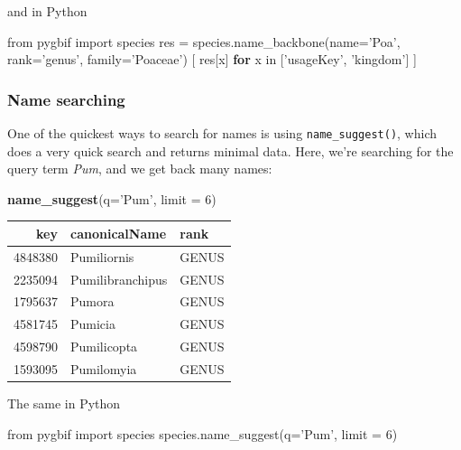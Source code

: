 \documentclass[author-year, review, 11pt]{components/elsarticle} %
\newenvironment{Shaded}{\begin{snugshade}}{\end{snugshade}}
\newcommand{\KeywordTok}[1]{\textcolor[rgb]{0.13,0.29,0.53}{\textbf{{#1}}}}
\newcommand{\DataTypeTok}[1]{\textcolor[rgb]{0.13,0.29,0.53}{{#1}}}
\newcommand{\DecValTok}[1]{\textcolor[rgb]{0.00,0.00,0.81}{{#1}}}
\newcommand{\CharTok}[1]{\textcolor[rgb]{0.31,0.60,0.02}{{#1}}}
\newcommand{\StringTok}[1]{\textcolor[rgb]{0.31,0.60,0.02}{{#1}}}
\newcommand{\NormalTok}[1]{{#1}}
\begin{document}
and in Python

\begin{Shaded}
\begin{Highlighting}[]
\CharTok{from} \NormalTok{pygbif }\CharTok{import} \NormalTok{species}
\NormalTok{res = species.name_backbone(name=}\StringTok{'Poa'}\NormalTok{, rank=}\StringTok{'genus'}\NormalTok{, family=}\StringTok{'Poaceae'}\NormalTok{)}
\NormalTok{[ res[x] }\KeywordTok{for} \NormalTok{x in [}\StringTok{'usageKey'}\NormalTok{, }\StringTok{'kingdom'}\NormalTok{] ]}
\end{Highlighting}
\end{Shaded}

\subsubsection{Name searching}\label{name-searching}

One of the quickest ways to search for names is using
\texttt{name\_suggest()}, which does a very quick search and returns
minimal data. Here, we're searching for the query term \emph{Pum}, and
we get back many names:

\begin{Shaded}
\begin{Highlighting}[]
\KeywordTok{name_suggest}\NormalTok{(}\DataTypeTok{q=}\StringTok{'Pum'}\NormalTok{, }\DataTypeTok{limit =} \DecValTok{6}\NormalTok{)}
\end{Highlighting}
\end{Shaded}

\begin{longtable}[c]{@{}rll@{}}
\toprule
key & canonicalName & rank\tabularnewline
\midrule
\endhead
4848380 & Pumiliornis & GENUS\tabularnewline
2235094 & Pumilibranchipus & GENUS\tabularnewline
1795637 & Pumora & GENUS\tabularnewline
4581745 & Pumicia & GENUS\tabularnewline
4598790 & Pumilicopta & GENUS\tabularnewline
1593095 & Pumilomyia & GENUS\tabularnewline
\bottomrule
\end{longtable}

The same in Python

\begin{Shaded}
\begin{Highlighting}[]
\CharTok{from} \NormalTok{pygbif }\CharTok{import} \NormalTok{species}
\NormalTok{species.name_suggest(q=}\StringTok{'Pum'}\NormalTok{, limit = }\DecValTok{6}\NormalTok{)}
\end{Highlighting}
\end{Shaded}
\end{document}
